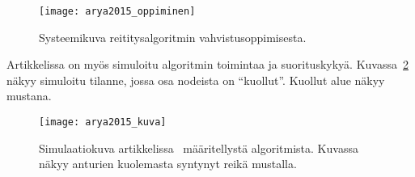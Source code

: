 \begin{figure}[h]
  \centering
  \texttt{[image: arya2015\_oppiminen]}
  \caption{Systeemikuva reititysalgoritmin vahvistusoppimisesta.~\parencite{Arya2015}}
\label{fig:arya2015_oppiminen}
\end{figure}

Artikkelissa on myös simuloitu algoritmin toimintaa ja suorituskykyä.
Kuvassa~\ref{fig:arya2015} näkyy simuloitu tilanne, jossa osa nodeista on
``kuollut''. Kuollut alue näkyy mustana.

\begin{figure}[h]
  \centering
  \texttt{[image: arya2015\_kuva]}
  \caption{Simulaatiokuva artikkelissa~\cite{Arya2015} määritellystä
algoritmista. Kuvassa näkyy anturien kuolemasta syntynyt reikä mustalla.}
\label{fig:arya2015}
\end{figure}

